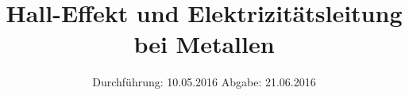 

\subject{V311  Korrektur}
\title{Hall-Effekt und Elektrizitätsleitung bei Metallen}
\date{
  Durchführung: 10.05.2016
  \hspace{3em}
  Abgabe: 21.06.2016
}



\maketitle
\thispagestyle{empty}
\tableofcontents
\newpage







\printbibliography



